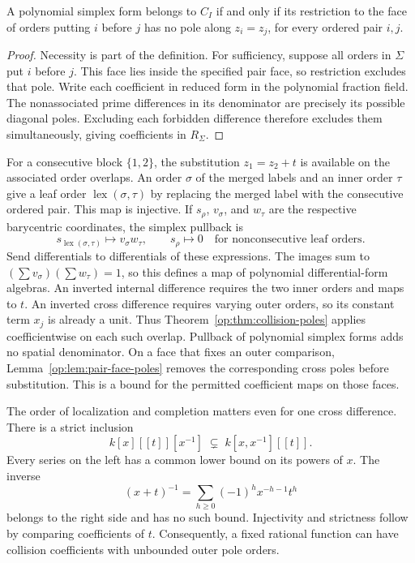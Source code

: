 \begin{lemma}
\label{op:lem:pair-face-poles}
A polynomial simplex form belongs to \(C_I\) if and only if its
restriction to the face of orders putting \(i\) before \(j\) has
no pole along \(z_i=z_j\), for every ordered pair \(i,j\).
\end{lemma}

\begin{proof}
Necessity is part of the definition.  For sufficiency, suppose all
orders in \(\Sigma\) put \(i\) before \(j\).  This face lies
inside the specified pair face, so restriction excludes that pole.
Write each coefficient in reduced form in the polynomial fraction
field.  The nonassociated prime differences in its denominator are
precisely its possible diagonal poles.  Excluding each forbidden
difference therefore excludes them simultaneously, giving
coefficients in \(R_\Sigma\).
\end{proof}

For a consecutive block \(\{1,2\}\), the substitution
\(z_1=z_2+t\) is available on the associated order overlaps.
An order \(\sigma\) of the merged labels and an inner order \(\tau\)
give a leaf order \(\operatorname{lex}(\sigma,\tau)\) by replacing
the merged label with the consecutive ordered pair.  This map is
injective.  If \(s_\rho\), \(v_\sigma\), and \(w_\tau\)
are the respective barycentric coordinates, the simplex pullback is
\[
 s_{\operatorname{lex}(\sigma,\tau)}\longmapsto v_\sigma w_\tau,
 \qquad s_\rho\longmapsto0
 \quad\text{for nonconsecutive leaf orders}.
\]
Send differentials to differentials of these expressions.
The images sum to \((\sum v_\sigma)(\sum w_\tau)=1\), so this
defines a map of polynomial differential-form algebras.
An inverted internal difference requires the two inner orders and
maps to \(t\).  An inverted cross difference requires varying outer
orders, so its constant term \(x_j\) is already a unit.
Thus Theorem~\ref{op:thm:collision-poles} applies coefficientwise on
each such overlap.  Pullback of polynomial simplex forms adds no
spatial denominator.  On a face that fixes an outer comparison,
Lemma~\ref{op:lem:pair-face-poles} removes the corresponding cross poles
before substitution.  This is a bound for the permitted coefficient
maps on those faces.

The order of localization and completion matters even for one cross
difference.  There is a strict inclusion
\begin{equation}\label{op:eq:pole-completion-inclusion}
 k[x][[t]][x^{-1}]
 \;\subsetneq\;
 k[x,x^{-1}][[t]].
\end{equation}
Every series on the left has a common lower bound on its powers of
\(x\).  The inverse
\[
 (x+t)^{-1}=\sum_{h\ge0}(-1)^h x^{-h-1}t^h
\]
belongs to the right side and has no such bound.  Injectivity and
strictness follow by comparing coefficients of \(t\).
Consequently, a fixed rational function can have collision
coefficients with unbounded outer pole orders.


